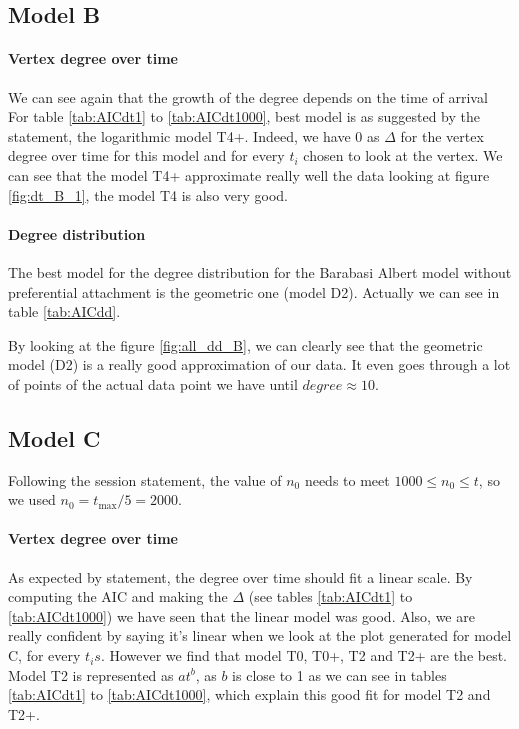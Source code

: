 \documentclass[a4paper]{article}
\begin{document}
\subsection{Model B}

\paragraph{Vertex degree over time}

We can see again that the growth of the degree depends on the time of arrival 
For table \ref{tab:AICdt1} to \ref{tab:AICdt1000}, best model is as suggested by
the statement, the logarithmic model T4+. Indeed, we have 0 as $\Delta$ for the
vertex degree over time for this model and for every $t_i$ chosen to look at the
vertex. We can see that the model T4+ approximate really well the data looking
at figure \ref{fig:dt_B_1}, the model T4 is also very good.

\paragraph{Degree distribution}


The best model for the degree distribution for the Barabasi Albert model without
preferential attachment is the geometric one (model D2). Actually we can see
 in table
\ref{tab:AICdd}.

By looking at the figure \ref{fig:all_dd_B}, we can clearly see that
the geometric model (D2) is a really good approximation of our data. It
even goes through a lot of points of the actual data point we have until
$degree \approx 10$.

\subsection{Model C}

Following the session statement, the value of $n_0$ needs to meet $1000 \le n_0 
\le t$, so we used $n_0 = t_{\max} / 5 = 2000 $.

\paragraph{Vertex degree over time}

As expected by statement, the degree over time should fit a linear scale. By
computing the AIC and making the $\Delta$ (see tables \ref{tab:AICdt1} to
\ref{tab:AICdt1000}) we have seen that the linear model was good. Also, we are
really confident by saying it's linear when we look at the plot generated for
model C, for every $t_is$. However we find that model T0, T0+, T2 and T2+ are
the best. Model T2 is represented as $at^b$, as $b$ is close to 1 as we can see
in tables \ref{tab:AICdt1} to \ref{tab:AICdt1000}, which explain this good fit
for model T2 and T2+.
\end{document}
